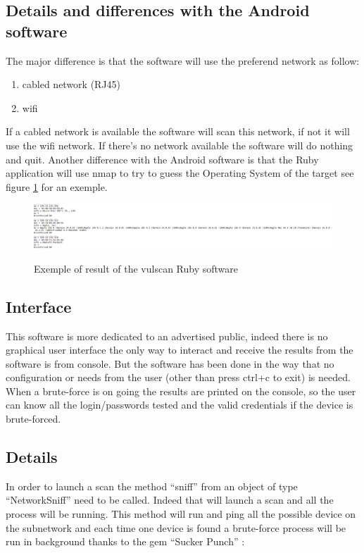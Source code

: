 \documentclass{report}
\begin{document}
\subsection{Details and differences with the Android software}
The major difference is that the software will use the preferend network as follow:
\begin{enumerate}
 \item cabled network (RJ45)
 \item wifi
\end{enumerate}
If a cabled network is available the software will scan this network, if not it will use the wifi network. If there's no network available the software will do nothing and quit.\newline
Another difference with the Android software is that the Ruby application will use nmap to try to guess the Operating System of the target see figure \ref{fig:result-os} for an exemple.
\begin{figure}
 \caption{Exemple of result of the vulscan Ruby software}
 \centering
 \includegraphics[width=1.2\textwidth]{./img/result-os}
 \label{fig:result-os}
\end{figure}

\subsection{Interface}
This software is more dedicated to an advertised public, indeed there is no graphical user interface the only way to interact and receive the results from the software is from console. But the software has been done in the way that no configuration or needs from the user (other than press ctrl+c to exit) is needed. When a brute-force is on going the results are printed on the console, so the user can know all the login/passwords tested and the valid credentials if the device is brute-forced.

\subsection{Details}
In order to launch a scan the method ``sniff'' from an object of type ``NetworkSniff'' need to be called. Indeed that will launch a scan and all the process will be running. This method will run and ping all the possible device on the subnetwork and each time one device is found a brute-force process will be run in background thanks to the gem ``Sucker Punch'' \autocite{suckerpunch}:
\end{document}
